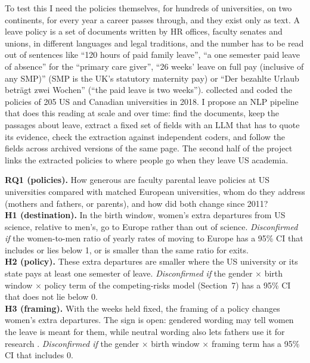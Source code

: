\documentclass[10pt,twocolumn]{article}
\begin{document}
To test this I need the policies themselves, for hundreds of universities, on two continents, for every year a career passes through, and they exist only as text. A leave policy is a set of documents written by HR offices, faculty senates and unions, in different languages and legal traditions, and the number has to be read out of sentences like ``120 hours of paid family leave'', ``a one semester paid leave of absence'' for the ``primary care giver'', ``26 weeks' leave on full pay (inclusive of any SMP)'' (SMP is the UK's statutory maternity pay) or ``Der bezahlte Urlaub beträgt zwei Wochen'' (``the paid leave is two weeks''). \citet{morgan2018} collected and coded the policies of 205 US and Canadian universities in 2018. I propose an NLP pipeline that does this reading at scale and over time: find the documents, keep the passages about leave, extract a fixed set of fields with an LLM that has to quote its evidence, check the extraction against independent coders, and follow the fields across archived versions of the same page. The second half of the project links the extracted policies to where people go when they leave US academia.

\begin{hypbox}
\textbf{RQ1 (policies).} How generous are faculty parental leave policies at US universities compared with matched European universities, whom do they address (mothers and fathers, or parents), and how did both change since 2011?\\[2pt]
\textbf{H1 (destination).} In the birth window, women's extra departures from US science, relative to men's, go to Europe rather than out of science. \emph{Disconfirmed if} the women-to-men ratio of yearly rates of moving to Europe has a 95\% CI that includes or lies below 1, or is smaller than the same ratio for exits.\\[2pt]
\textbf{H2 (policy).} These extra departures are smaller where the US university or its state pays at least one semester of leave. \emph{Disconfirmed if} the gender $\times$ birth window $\times$ policy term of the competing-risks model (Section~7) has a 95\% CI that does not lie below 0.\\[2pt]
\textbf{H3 (framing).} With the weeks held fixed, the framing of a policy changes women's extra departures. The sign is open: gendered wording may tell women the leave is meant for them, while neutral wording also lets fathers use it for research \citep{antecol2018}. \emph{Disconfirmed if} the gender $\times$ birth window $\times$ framing term has a 95\% CI that includes 0.
\end{hypbox}
\end{document}
